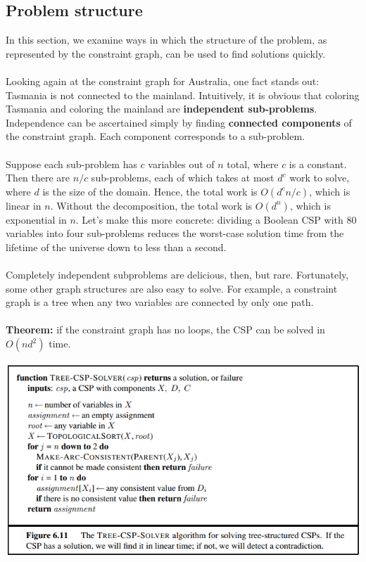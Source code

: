 \subsection{Problem structure}
In this section, we examine ways in which the structure of the problem, as represented by the constraint graph, can be used to find solutions quickly.\\\\
Looking again at the constraint graph for Australia, one fact stands out: Tasmania is not connected to the mainland. Intuitively, it is obvious that coloring Tasmania and coloring the mainland are \textbf{independent sub-problems}. Independence can be ascertained simply by finding \textbf{connected components} of the constraint graph. Each component corresponds to a sub-problem.\\\\
Suppose each sub-problem has $c$ variables out of $n$ total, where $c$ is a constant. Then there are $n/c$ sub-problems, each of which takes at most $d^c$ work to solve, where $d$ is the size of the domain. Hence, the total work is $O(d^c n/c)$, which is linear in $n$. Without the decomposition, the total work is $O(d^n)$, which is exponential in $n$. Let’s make this more concrete: dividing a Boolean CSP with 80 variables into four sub-problems reduces the worst-case solution time from the lifetime of the universe down to less than a second.\\\\
Completely independent subproblems are delicious, then, but rare.  Fortunately, some
other graph structures are also easy to solve. For example, a constraint graph is a tree when any two variables are connected by only one path.\\\\
\textbf{Theorem:} if the constraint graph has no loops, the CSP can be solved in $O(nd^2)$ time.
\begin{center}
    \includegraphics[]{images/CSP-Tree.png}
\end{center}


